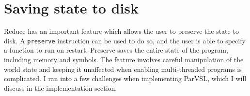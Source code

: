 \section{Saving state to disk}
Reduce has an important feature which allows the user to preserve the state to disk. A \texttt{preserve} instruction can be
used to do so, and the user is able to specify a function to run on restart. Preserve saves the entire state of the
program, including memory and symbols. The feature involves careful manipulation of the world state and keeping it
unaffected when enabling multi-threaded programs is complicated. I ran into a few challenges when implementing ParVSL,
which I will discuss in the implementation section.
